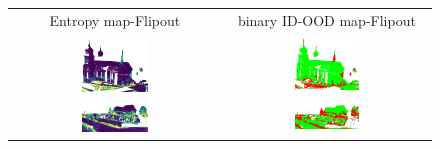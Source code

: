     \begin{figure}[h!]
        \centering
        \begin{tabular}{cc}
            Entropy map-Flipout & binary ID-OOD map-Flipout \\
            \includegraphics[width=0.33\textwidth, height=0.18\textheight]{images/ood_imgs/fout_sem3d/fout_ent_1.pdf}& 
            \includegraphics[width=0.33\textwidth, height=0.18\textheight]{images/ood_imgs/fout_sem3d/fout_ent_ood_auroc_1.pdf}\\

            \includegraphics[width=0.33\textwidth, height=0.18\textheight]{images/ood_imgs/fout_sem3d/fout_ent_2.pdf}& 
            \includegraphics[width=0.33\textwidth, height=0.18\textheight]{images/ood_imgs/fout_sem3d/fout_ent_ood_auroc_2.pdf}\\


\end{tabular}
\end{figure}

